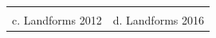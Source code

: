 \documentclass{standalone}
\begin{document}
\begin{tabular}{m{} m{}}
\\
\\
\multicolumn{1}{c}{c. Landforms 2012} & \multicolumn{1}{c}{d. Landforms 2016}\\
%
\end{tabular}
\end{document}
